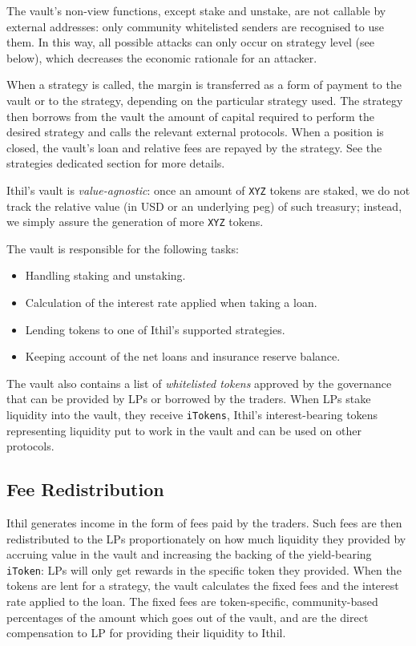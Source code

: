 \documentclass[a4paper,10 pt]{article}
\theoremstyle{definition}
\begin{document}
The vault's non-view functions, except stake and unstake, are not callable by external addresses: only community whitelisted senders are recognised to use them. In this way, all possible attacks can only occur on strategy level (see below), which decreases the economic rationale for an attacker.

When a strategy is called, the margin is transferred as a form of payment to the vault or to the strategy, depending on the particular strategy used. The strategy then borrows from the vault the amount of capital required to perform the desired strategy and calls the relevant external protocols. When a position is closed, the vault's loan and relative fees are repayed by the strategy. See the strategies dedicated section for more details.

Ithil's vault is \textit{value-agnostic}: once an amount of \verb|XYZ| tokens are staked, we do not track the relative value (in USD or an underlying peg) of such treasury; instead, we simply assure the generation of more \verb|XYZ| tokens.

The vault is responsible for the following tasks:
\begin{itemize}
\item Handling staking and unstaking.
\item Calculation of the interest rate applied when taking a loan.
\item Lending tokens to one of Ithil’s supported strategies.
\item Keeping account of the net loans and insurance reserve balance.
\end{itemize}

The vault also contains a list of {\it whitelisted tokens} approved by the governance that can be provided by LPs or borrowed by the traders. When LPs stake liquidity into the vault, they receive \verb|iTokens|, Ithil's interest-bearing tokens representing liquidity put to work in the vault and can be used on other protocols.

\subsection{Fee Redistribution}

Ithil generates income in the form of fees paid by the traders. Such fees are then redistributed to the LPs proportionately on how much liquidity they provided by accruing value in the vault and increasing the backing of the yield-bearing \verb|iToken|: LPs will only get rewards in the specific token they provided. When the tokens are lent for a strategy, the vault calculates the fixed fees and the interest rate applied to the loan. The fixed fees are token-specific, community-based percentages of the amount which goes out of the vault, and are the direct compensation to LP for providing their liquidity to Ithil. 
\end{document}
